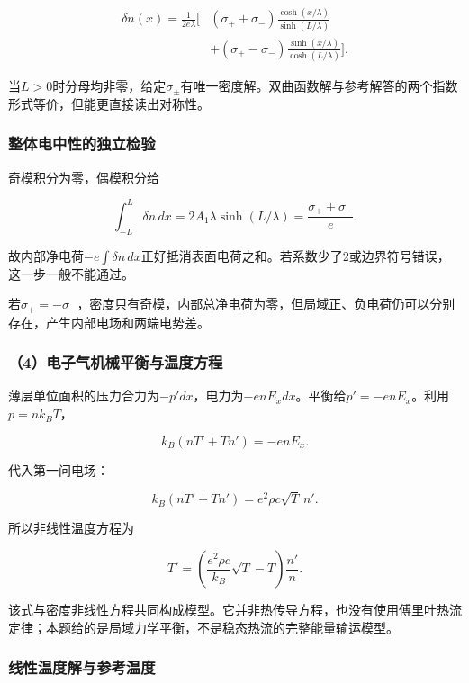 \documentclass[12pt,a4paper,fontset=fandol]{ctexart}
\begin{document}
\[
\boxed{
\begin{aligned}
\delta n(x)=\frac1{2e\lambda}\bigg[
&(\sigma_++\sigma_-)\frac{\cosh(x/\lambda)}{\sinh(L/\lambda)}\\
&+(\sigma_+-\sigma_-)\frac{\sinh(x/\lambda)}{\cosh(L/\lambda)}
\bigg].
\end{aligned}}
\]

当\(L>0\)时分母均非零，给定\(\sigma_\pm\)有唯一密度解。双曲函数解与参考解答的两个指数形式等价，但能更直接读出对称性。

\subsubsection{整体电中性的独立检验}\label{ux6574ux4f53ux7535ux4e2dux6027ux7684ux72ecux7acbux68c0ux9a8c}

奇模积分为零，偶模积分给

\[
\int_{-L}^L\delta n\,dx
=2A_1\lambda\sinh(L/\lambda)
=\frac{\sigma_++\sigma_-}{e}.
\]

故内部净电荷\(-e\int\delta n\,dx\)正好抵消表面电荷之和。若系数少了2或边界符号错误，这一步一般不能通过。

若\(\sigma_+=-\sigma_-\)，密度只有奇模，内部总净电荷为零，但局域正、负电荷仍可以分别存在，产生内部电场和两端电势差。

\subsubsection{（4）电子气机械平衡与温度方程}\label{ux7535ux5b50ux6c14ux673aux68b0ux5e73ux8861ux4e0eux6e29ux5ea6ux65b9ux7a0b}

薄层单位面积的压力合力为\(-p'dx\)，电力为\(-enE_xdx\)。平衡给\(p'=-enE_x\)。利用\(p=nk_BT\)，

\[
k_B(nT'+Tn')=-enE_x.
\]

代入第一问电场：

\[
k_B(nT'+Tn')=e^2\rho c\sqrt T\,n'.
\]

所以非线性温度方程为

\[
\boxed{
T'=\left(\frac{e^2\rho c}{k_B}\sqrt T-T\right)\frac{n'}n}.
\]

该式与密度非线性方程共同构成模型。它并非热传导方程，也没有使用傅里叶热流定律；本题给的是局域力学平衡，不是稳态热流的完整能量输运模型。

\subsubsection{线性温度解与参考温度}\label{ux7ebfux6027ux6e29ux5ea6ux89e3ux4e0eux53c2ux8003ux6e29ux5ea6}
\end{document}
